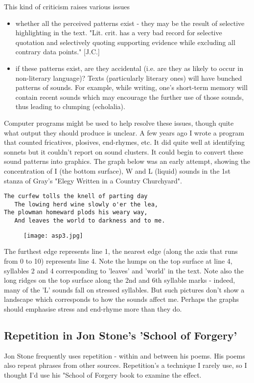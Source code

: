 \documentclass[11pt]{article}
\begin{document}
This kind of criticism raises various issues
\begin{itemize}
\item    whether all the perceived patterns exist - they may be the result of selective highlighting in the text. "Lit. crit. has a very bad record for selective quotation and selectively quoting supporting evidence while excluding all contrary data points." [J.C.]
\item    if these patterns exist, are they accidental (i.e. are they as likely to occur in non-literary language)? Texts (particularly literary ones) will have bunched patterns of sounds. For example, while writing, one's short-term memory will contain recent sounds which may encourage the further use of those sounds, thus leading to clumping (echolalia).
\end{itemize}
Computer programs might be used to help resolve these issues, though quite what output they should produce is unclear. A few years ago I wrote a program that counted fricatives, plosives, end-rhymes, etc. It did quite well at identifying sonnets but it couldn't report on sound clusters. It could begin to convert these sound patterns into graphics. The graph below was an early attempt, showing the concentration of I (the bottom surface), W and L (liquid) sounds in the 1st stanza of Gray's "Elegy Written in a Country Churchyard".
\begin{verbatim}
The curfew tolls the knell of parting day
   The lowing herd wine slowly o'er the lea,
The plowman homeward plods his weary way,
   And leaves the world to darkness and to me.
\end{verbatim}
\begin{figure}[htbp]
\centering
\texttt{[image: asp3.jpg]}
\end{figure}

The furthest edge represents line 1, the nearest edge (along the axis that runs from 0 to 10) represents line 4. Note the humps on the top surface at line 4, syllables 2 and 4 corresponding to 'leaves' and 'world' in the text. Note also the long ridges on the top surface along the 2nd and 6th syllable marks - indeed, many of the 'L' sounds fall on stressed syllables. But such pictures don't show a landscape which corresponds to how the sounds affect me. Perhaps the graphs should emphasise stress and end-rhyme more than they do. 



\newpage\subsection{Repetition in Jon Stone's 'School of Forgery'}
Jon Stone frequently uses repetition - within and between his poems. His poems also repeat phrases from other sources. Repetition's a technique I rarely use, so I thought I'd use his "School of Forgery book to examine the effect.
\end{document}
